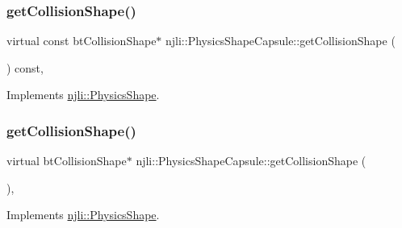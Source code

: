 \subsubsection{\texorpdfstring{get\+Collision\+Shape()}{getCollisionShape()}\hspace{0.1cm}{\footnotesize\ttfamily [1/2]}}
{\footnotesize\ttfamily virtual const bt\+Collision\+Shape$\ast$ njli\+::\+Physics\+Shape\+Capsule\+::get\+Collision\+Shape (\begin{DoxyParamCaption}{ }\end{DoxyParamCaption}) const\hspace{0.3cm}{\ttfamily [protected]}, {\ttfamily [virtual]}}



Implements \mbox{\hyperlink{classnjli_1_1_physics_shape_a527e956caca24bf16ed0d47f69ff14e8}{njli\+::\+Physics\+Shape}}.

\mbox{\label{classnjli_1_1_physics_shape_capsule_a7d13876272eca6b0fd5d7f04392b134e}} 
\subsubsection{\texorpdfstring{get\+Collision\+Shape()}{getCollisionShape()}\hspace{0.1cm}{\footnotesize\ttfamily [2/2]}}
{\footnotesize\ttfamily virtual bt\+Collision\+Shape$\ast$ njli\+::\+Physics\+Shape\+Capsule\+::get\+Collision\+Shape (\begin{DoxyParamCaption}{ }\end{DoxyParamCaption})\hspace{0.3cm}{\ttfamily [protected]}, {\ttfamily [virtual]}}



Implements \mbox{\hyperlink{classnjli_1_1_physics_shape_a2910f0362035c971f245349a55378b01}{njli\+::\+Physics\+Shape}}.

\mbox{\label{classnjli_1_1_physics_shape_capsule_a3ae09d2ff8191ddbe9cf610f4795eab1}} 

